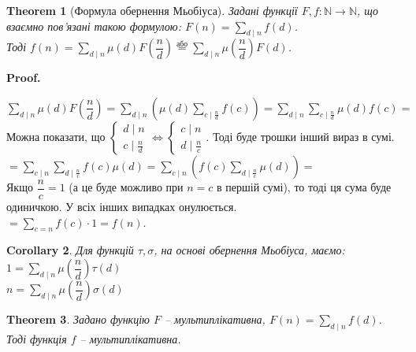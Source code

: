\documentclass[a4paper, 14pt]{extarticle}
\makeatletter
\theoremstyle{theoremdd}
\newtheorem{theorem}{Theorem}[subsection]
\theoremstyle{theoremdd}
\theoremstyle{theoremdd}
\theoremstyle{theoremdd}
\theoremstyle{theoremdd}
\theoremstyle{theoremdd}
\theoremstyle{theoremdd}
\theoremstyle{theoremdd}
\newtheorem{corollary}[theorem]{Corollary}
\def\qed{$\blacksquare$}
\renewenvironment{proof}[1][Proof.\\]{\par
\pushQED{\hfill \qed}%
\normalfont \topsep6\p@\@plus6\p@\relax
\trivlist
\item\relax
{\bfseries
#1\@addpunct{.}}\hspace\labelsep\ignorespaces
}{%
\popQED\endtrivlist\@endpefalse
}
\makeatother
\begin{document}
\begin{theorem}[Формула обернення Мьобіуса]
Задані функції $F,f \colon \mathbb{N} \to \mathbb{N}$, що взаємно пов'язані такою формулою: $F(n) = \displaystyle\sum_{d \mid n} f(d)$. \\
Тоді $f(n) = \displaystyle\sum_{d \mid n} \mu(d) F\left(\dfrac{n}{d} \right) \overset{\text{або}}{=} \sum_{d \mid n} \mu\left( \dfrac{n}{d} \right) F(d)$.
\end{theorem}

\begin{proof}
$\displaystyle\sum_{d \mid n} \mu(d) F\left( \dfrac{n}{d} \right) = \sum_{d \mid n} \left( \mu(d) \sum_{c \mid \frac{n}{d}} f(c) \right) = \sum_{d \mid n} \sum_{c \mid \frac{n}{d}} \mu(d)f(c) \boxed{=}$\\
Можна показати, що $\begin{cases} d \mid n \\ c \mid \frac{n}{d} \end{cases} \iff \begin{cases} c \mid n \\ d \mid \frac{n}{c} \end{cases}$. Тоді буде трошки інший вираз в сумі.\\
$\boxed{=} \displaystyle\sum_{c \mid n} \sum_{d \mid \frac{n}{c}} f(c) \mu(d) = \sum_{c \mid n} \left( f(c) \sum_{d \mid \frac{n}{c}} \mu(d) \right) \boxed{\boxed{=}}$\\
Якщо $\dfrac{n}{c} = 1$ (а це буде можливо при $n = c$ в першій сумі), то тоді ця сума буде одиничкою. У всіх інших випадках онулюється.\\
$\boxed{\boxed{=}} \displaystyle\sum_{c = n} f(c) \cdot 1 = f(n)$.
\end{proof}

\begin{corollary}
Для функцій $\tau,\sigma$, на основі обернення Мьобіуса, маємо:\\
$1 = \displaystyle\sum_{d \mid n} \mu\left( \dfrac{n}{d} \right) \tau(d)$\\
$n = \displaystyle\sum_{d \mid n} \mu\left( \dfrac{n}{d} \right) \sigma(d)$
\end{corollary}

\begin{theorem}
Задано функцію $F$ -- мультиплікативна, $F(n) = \displaystyle\sum_{d \mid n} f(d)$. Тоді функція $f$ -- мультиплікативна.
\end{theorem}
\end{document}
